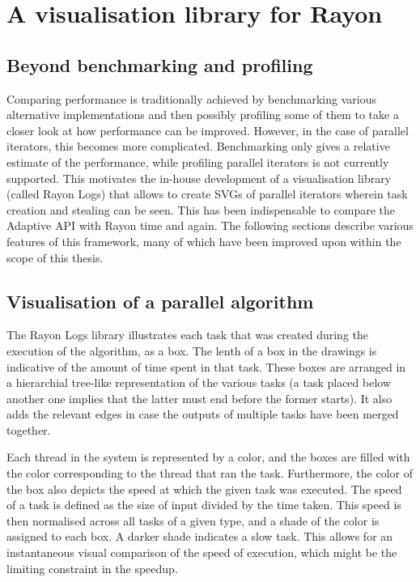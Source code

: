 
\chapter{A visualisation library for Rayon} %

\label{Chapter4} %


\section{Beyond benchmarking and profiling}
Comparing performance is traditionally achieved by benchmarking various alternative implementations and then possibly profiling some of them to take a closer look at how performance can be improved. However, in the case of parallel iterators, this becomes more complicated. Benchmarking only gives a relative estimate of the performance, while profiling parallel iterators is not currently supported. This motivates the in-house development of a visualisation library (called Rayon Logs) that allows to create SVGs of parallel iterators wherein task creation and stealing can be seen. This has been indispensable to compare the Adaptive API with Rayon time and again. The following sections describe various features of this framework, many of which have been improved upon within the scope of this thesis.
\section{Visualisation of a parallel algorithm}
The Rayon Logs library illustrates each task that was created during the execution of the algorithm, as a box. The lenth of a box in the drawings is indicative of the amount of time spent in that task. These boxes are arranged in a hierarchial tree-like representation of the various tasks (a task placed below another one implies that the latter must end before the former starts). It also adds the relevant edges in case the outputs of multiple tasks have been merged together.

Each thread in the system is represented by a color, and the boxes are filled with the color corresponding to the thread that ran the task. Furthermore, the color of the box also depicts the speed at which the given task was executed. The speed of a task is defined as the size of input divided by the time taken. This speed is then normalised across all tasks of a given type, and a shade of the color is assigned to each box. A darker shade indicates a slow task. This allows for an instantaneous visual comparison of the speed of execution, which might be the limiting constraint in the speedup.


